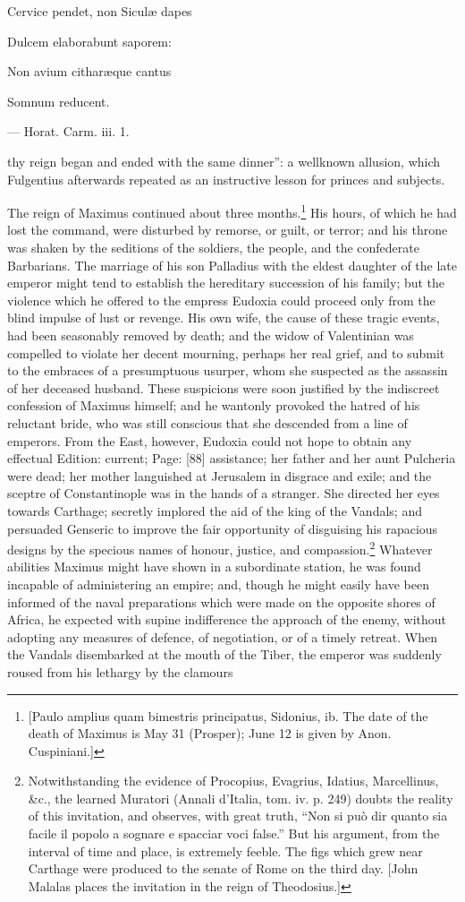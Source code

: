 {Cervice pendet, non Siculæ dapes

Dulcem elaborabunt saporem:

Non avium citharæque cantus

Somnum reducent.

\texthebrew{—} Horat. Carm. iii. 1.} thy reign began and ended with the same dinner\texthebrew{}”: a wellknown allusion, which Fulgentius afterwards repeated as an instructive lesson for princes and subjects.

The reign of Maximus continued about three months.\footnote{[Paulo amplius quam bimestris principatus, Sidonius, ib. The date of the death of Maximus is May 31 (Prosper); June 12 is given by Anon. Cuspiniani.]} His hours, of which he had lost the command, were disturbed by remorse, or guilt, or terror; and his throne was shaken by the seditions of the soldiers, the people, and the confederate Barbarians. The marriage of his son Palladius with the eldest daughter of the late emperor might tend to establish the hereditary succession of his family; but the violence which he offered to the empress Eudoxia could proceed only from the blind impulse of lust or revenge. His own wife, the cause of these tragic events, had been seasonably removed by death; and the widow of Valentinian was compelled to violate her decent mourning, perhaps her real grief, and to submit to the embraces of a presumptuous usurper, whom she suspected as the assassin of her deceased husband. These suspicions were soon justified by the indiscreet confession of Maximus himself; and he wantonly provoked the hatred of his reluctant bride, who was still conscious that she descended from a line of emperors. From the East, however, Eudoxia could not hope to obtain any effectual Edition: current; Page: [88] assistance; her father and her aunt Pulcheria were dead; her mother languished at Jerusalem in disgrace and exile; and the sceptre of Constantinople was in the hands of a stranger. She directed her eyes towards Carthage; secretly implored the aid of the king of the Vandals; and persuaded Genseric to improve the fair opportunity of disguising his rapacious designs by the specious names of honour, justice, and compassion.\footnote{Notwithstanding the evidence of Procopius, Evagrius, Idatius, Marcellinus, \&c., the learned Muratori (Annali d\texthebrew{}’Italia, tom. iv. p. 249) doubts the reality of this invitation, and observes, with great truth, \texthebrew{“}Non si può dir quanto sia facile il popolo a sognare e spacciar voci false.\texthebrew{}” But his argument, from the interval of time and place, is extremely feeble. The figs which grew near Carthage were produced to the senate of Rome on the third day. [John Malalas places the invitation in the reign of Theodosius.]} Whatever abilities Maximus might have shown in a subordinate station, he was found incapable of administering an empire; and, though he might easily have been informed of the naval preparations which were made on the opposite shores of Africa, he expected with supine indifference the approach of the enemy, without adopting any measures of defence, of negotiation, or of a timely retreat. When the Vandals disembarked at the mouth of the Tiber, the emperor was suddenly roused from his lethargy by the clamours 